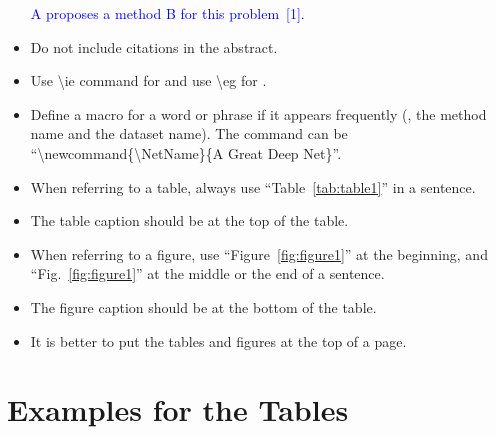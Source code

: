 \documentclass[10pt,twocolumn,letterpaper]{article}
\newcommand{\correct}[1]{\textcolor{blue}{#1 \checkmark}}
\begin{document}
\begin{itemize}
        \correct{A proposes a method B for this problem~[1].}
    \item Do not include citations in the abstract.
    \item Use \textbackslash ie command for \ie and use \textbackslash eg for \eg.
    \item Define a macro for a word or phrase if it appears frequently (\eg, the method name and the dataset name). The command can be\\``\textbackslash newcommand\{\textbackslash NetName\}\{A Great Deep Net\}''.
    \item When referring to a table, always use ``Table~\ref{tab:table1}'' in a sentence.
    \item The table caption should be at the top of the table.
    \item When referring to a figure, use ``Figure~\ref{fig:figure1}'' at the beginning, and ``Fig.~\ref{fig:figure1}'' at the middle or the end of a sentence.
    \item The figure caption should be at the bottom of the table.
    \item It is better to put the tables and figures at the top of a page.
\end{itemize}


\clearpage
\section{Examples for the Tables}

\newpage



\clearpage

\end{document}
